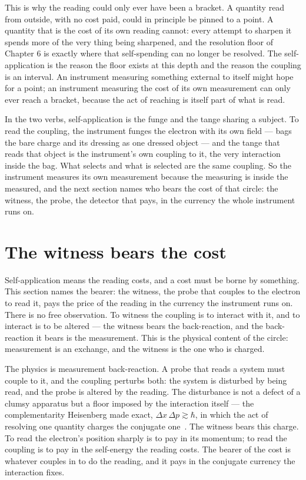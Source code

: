 This is why the reading could only ever have been a bracket. A quantity read from outside, with no cost paid, could in
principle be pinned to a point. A quantity that is the cost of its own reading cannot: every attempt to sharpen it spends
more of the very thing being sharpened, and the resolution floor of Chapter 6 is exactly where that self-spending can no
longer be resolved. The self-application is the reason the floor exists at this depth and the reason the coupling is an
interval. An instrument measuring something external to itself might hope for a point; an instrument measuring the cost of
its own measurement can only ever reach a bracket, because the act of reaching is itself part of what is read.

In the two verbs, self-application is the funge and the tange sharing a subject. To read the coupling, the instrument funges
the electron with its own field --- bags the bare charge and its dressing as one dressed object --- and the tange that reads
that object is the instrument's own coupling to it, the very interaction inside the bag. What selects and what is selected
are the same coupling. So the instrument measures its own measurement because the measuring is inside the measured, and the
next section names who bears the cost of that circle: the witness, the probe, the detector that pays, in the currency the
whole instrument runs on.

\section{The witness bears the cost}

Self-application means the reading costs, and a cost must be borne by something. This section names the bearer: the witness,
the probe that couples to the electron to read it, pays the price of the reading in the currency the instrument runs on. There
is no free observation. To witness the coupling is to interact with it, and to interact is to be altered --- the witness bears
the back-reaction, and the back-reaction it bears is the measurement. This is the physical content of the circle: measurement
is an exchange, and the witness is the one who is charged.

The physics is measurement back-reaction. A probe that reads a system must couple to it, and the coupling perturbs both:
the system is disturbed by being read, and the probe is altered by the reading. The disturbance is not a defect of a clumsy
apparatus but a floor imposed by the interaction itself --- the complementarity Heisenberg made exact, $\Delta x\,\Delta p
\gtrsim \hbar$, in which the act of resolving one quantity charges the conjugate one~\cite{heisenberg1927}. The witness bears
this charge. To read the electron's position sharply is to pay in its momentum; to read the coupling is to pay in the
self-energy the reading costs. The bearer of the cost is whatever couples in to do the reading, and it pays in the conjugate
currency the interaction fixes.

